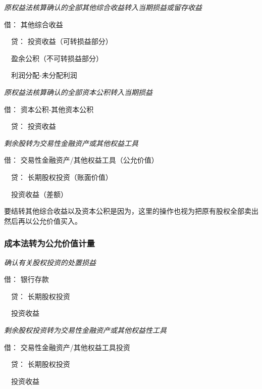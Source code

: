 \documentclass[UTF8,12pt]{ctexart}
\newenvironment{Dr}{\noindent 借：}{\par}
\newenvironment{Cr}{\noindent \ \ 贷：}{\par}
\numberwithin{equation}{section} %
\numberwithin{figure}{section}
\numberwithin{table}{section}
\begin{document}
	\textit{原权益法核算确认的全部其他综合收益转入当期损益或留存收益}
	
	\begin{Dr}
		其他综合收益
	\end{Dr}
	\begin{Cr}
		投资收益（可转损益部分）
		
		\ \ 盈余公积（不可转损益部分）
		
		\ \ 利润分配-未分配利润
	\end{Cr}
	
	\textit{原权益法核算确认的全部资本公积转入当期损益}
	
	\begin{Dr}
		资本公积-其他资本公积
	\end{Dr}
	\begin{Cr}
		投资收益
	\end{Cr}
	
	\textit{剩余股转为交易性金融资产或其他权益工具}
	
	\begin{Dr}
		交易性金融资产/其他权益工具（公允价值）
	\end{Dr}
	\begin{Cr}
		长期股权投资（账面价值）
		
		\ \ 投资收益（差额）
	\end{Cr}
	
	要结转其他综合收益以及资本公积是因为，这里的操作也视为把原有股权全部卖出然后再以公允价值买入。
	
	\subsubsection{成本法转为公允价值计量}
	\textit{确认有关股权投资的处置损益}
	
	\begin{Dr}
		银行存款
	\end{Dr}
	\begin{Cr}
		长期股权投资
		
		\ \ 投资收益
	\end{Cr}
	
	\textit{剩余股权投资转为交易性金融资产或其他权益性工具}
	
	\begin{Dr}
		交易性金融资产/其他权益工具投资
	\end{Dr}
	\begin{Cr}
		长期股权投资
		
		\ \ 投资收益
	\end{Cr}
	
	
	
\end{document}
